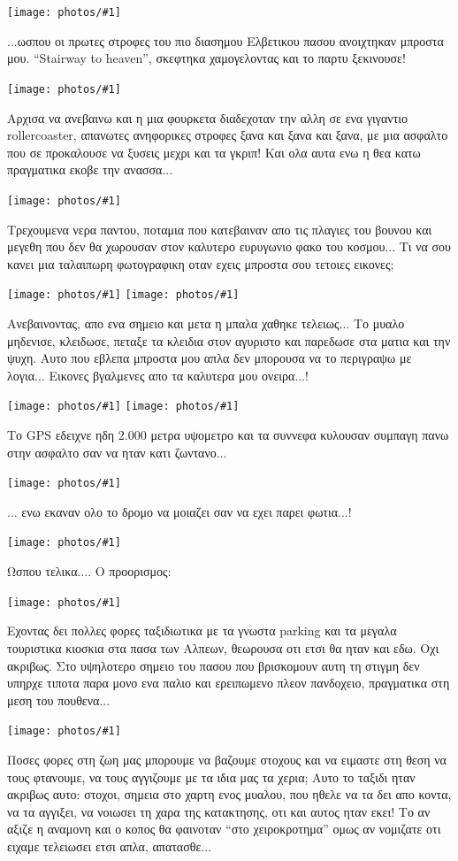 \documentclass[11pt, letterpaper]{book}
\newcommand\photo[1]{\noindent\texttt{[image: photos/\#1]}}
\begin{document}
\photo{45.jpg}

...ωσπου οι πρωτες στροφες του πιο διασημου Ελβετικου πασου ανοιχτηκαν μπροστα μου. 
``Stairway to heaven'', σκεφτηκα χαμογελοντας και το παρτυ ξεκινουσε!

\photo{46.jpg}

Αρχισα να ανεβαινω και η μια φουρκετα διαδεχοταν την αλλη σε ενα γιγαντιο rollercoaster, απανωτες ανηφορικες στροφες ξανα και ξανα και ξανα, με μια ασφαλτο που σε προκαλουσε να ξυσεις μεχρι και τα γκριπ! 
Και ολα αυτα ενω η θεα κατω πραγματικα εκοβε την ανασσα...

\photo{47.jpg}

Τρεχουμενα νερα παντου, ποταμια που κατεβαιναν απο τις πλαγιες του βουνου και μεγεθη που δεν θα χωρουσαν στον καλυτερο ευρυγωνιο φακο του κοσμου... Τι να σου κανει μια ταλαιπωρη φωτογραφικη οταν εχεις μπροστα σου τετοιες εικονες;

\photo{48.jpg}
\photo{49.jpg}

Ανεβαινοντας, απο ενα σημειο και μετα η μπαλα χαθηκε τελειως... Το μυαλο μηδενισε, κλειδωσε, πεταξε τα κλειδια στον αγυριστο και παρεδωσε στα ματια και την ψυχη. 
Αυτο που εβλεπα μπροστα μου απλα δεν μπορουσα να το περιγραψω με λογια... 
Εικονες βγαλμενες απο τα καλυτερα μου ονειρα...!

\photo{50.jpg}
\photo{51.jpg}

Το GPS εδειχνε ηδη 2.000 μετρα υψομετρο και τα συννεφα κυλουσαν συμπαγη πανω στην ασφαλτο σαν να ηταν κατι ζωντανο...

\photo{52.jpg}

... ενω εκαναν ολο το δρομο να μοιαζει σαν να εχει παρει φωτια...!

\photo{53.jpg}

Ωσπου τελικα.... Ο προορισμος:

\photo{54.jpg}

Εχοντας δει πολλες φορες ταξιδιωτικα με τα γνωστα parking και τα μεγαλα τουριστικα κιοσκια στα πασα των Αλπεων, θεωρουσα οτι ετσι θα ηταν και εδω. Οχι ακριβως. Στο υψηλοτερο σημειο του πασου που βρισκομουν αυτη τη στιγμη δεν υπηρχε τιποτα παρα μονο ενα παλιο και ερειπωμενο πλεον πανδοχειο, πραγματικα στη μεση του πουθενα... 

\photo{55.jpg}

Ποσες φορες στη ζωη μας μπορουμε να βαζουμε στοχους και να ειμαστε στη θεση να τους φτανουμε, να τους αγγιζουμε με τα ιδια μας τα χερια; Αυτο το ταξιδι ηταν ακριβως αυτο: στοχοι, σημεια στο χαρτη ενος μυαλου, που ηθελε να τα δει απο κοντα, να τα αγγιξει, να νοιωσει τη χαρα της κατακτησης, οτι και αυτος ηταν εκει! 
Το αν αξιζε η αναμονη και ο κοπος θα φαινοταν ``στο χειροκροτημα'' ομως αν νομιζατε οτι ειχαμε τελειωσει ετσι απλα, απατασθε...
\end{document}
